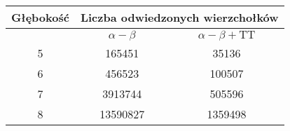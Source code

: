 \begin{tabular}{|c|c|c|}
\hline
Głębokość &\multicolumn{2}{|c|}{Liczba odwiedzonych wierzchołków}\\
\hline
& $\alpha - \beta$ &$\alpha - \beta + \text{TT}$ \\ 
\hline
5 & 165451 & 35136 \\
\hline
6 & 456523 & 100507 \\
\hline
7 & 3913744 & 505596 \\
\hline
8 & 13590827 & 1359498 \\
\hline
\end{tabular}
